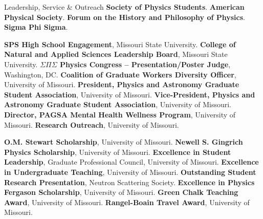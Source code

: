 \documentclass[a4paper,skipsamekey,11pt,english]{curve}
\begin{document}
\begin{rubric}{Leadership, Service \& Outreach}
  \entry*[2017--2021] \textbf{Society of Physics Students}.
  \entry*[2019--Present] \textbf{American Physical Society}.
  \entry*[2020--Present] \textbf{Forum on the History and Philosophy of Physics}.
  \entry*[2022--Present] \textbf{Sigma Phi Sigma}.

  \entry*[2017--2020] \textbf{SPS High School Engagement}, Missouri State University.
  \entry*[2018--2019] \textbf{College of Natural and Applied Sciences Leadership Board}, Missouri State University.
  \entry*[2022]       \textbf{$\Sigma \Pi \Sigma$ Physics Congress – Presentation/Poster Judge}, Washington, DC.
  \entry*[2022--2023] \textbf{Coalition of Graduate Workers Diversity Officer}, University of Missouri.
  \entry*[2022--2023] \textbf{President, Physics and Astronomy Graduate Student Association}, University of Missouri.
  \entry*[2023--2024] \textbf{Vice-President, Physics and Astronomy Graduate Student Association}, University of Missouri.
  \entry*[2022--2024] \textbf{Director, PAGSA Mental Health Wellness Program}, University of Missouri.
  \entry*[2022--2024] \textbf{Research Outreach}, University of Missouri.

  \entry*[2021] \textbf{O.M. Stewart Scholarship}, University of Missouri.
  \entry*[2022] \textbf{Newell S. Gingrich Physics Scholarship}, University of Missouri.
  \entry*[2022] \textbf{Excellence in Student Leadership}, Graduate Professional Council, University of Missouri.
  \entry*[2022] \textbf{Excellence in Undergraduate Teaching}, University of Missouri.
  \entry*[2023] \textbf{Outstanding Student Research Presentation}, Neutron Scattering Society.
  \entry*[2023] \textbf{Excellence in Physics Fergason Scholarship}, University of Missouri.
  \entry*[2023] \textbf{Green Chalk Teaching Award}, University of Missouri.
  \entry*[2023] \textbf{Rangel-Boain Travel Award}, University of Missouri.
\end{rubric}
\end{document}
